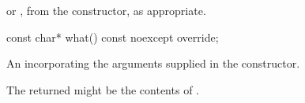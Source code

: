 \begin{itemdescr}
\pnum
\returns
{} or , from the constructor,
as appropriate.
\end{itemdescr}

%
\begin{itemdecl}
const char* what() const noexcept override;
\end{itemdecl}

\begin{itemdescr}
\pnum
\returns
An \ntbs{} incorporating the arguments supplied in the constructor.

\begin{note}
The returned \ntbs{} might be the contents of .
\end{note}
\end{itemdescr}
